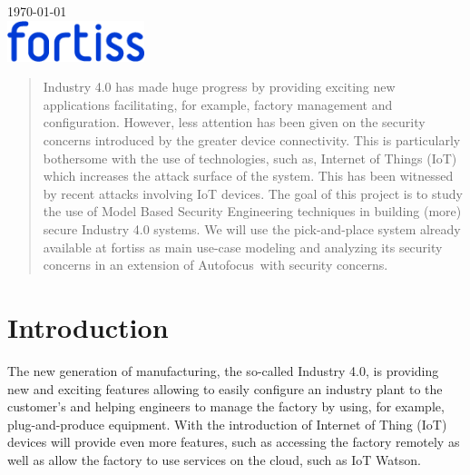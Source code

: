 \begin{titlepage}

{\large \today}\\[1.5cm] %


\includegraphics[width = 0.3\textwidth]{figures/fortiss.png}\\[0.5cm] %

\vfill %

\end{titlepage}

\newcommand\autofocus{Auto{\sc focus}}

\begin{abstract}
Industry 4.0 has made huge progress by providing exciting new applications facilitating, for example, factory management and configuration. However, less attention has been given on the security concerns introduced by the greater device connectivity. This is particularly bothersome with the use of technologies, such as, Internet of Things (IoT) which increases the attack surface of the system. This has been witnessed by recent attacks involving IoT devices. The goal of this project is to study the use of Model Based Security Engineering techniques in building (more) secure Industry 4.0 systems. We will use the pick-and-place system already available at fortiss as main use-case modeling and analyzing its security concerns in an extension of \autofocus\ with security concerns. 
\end{abstract}

\section{Introduction}
The new generation of manufacturing, the so-called Industry 4.0, is providing new and exciting features allowing to easily configure an industry plant to the customer's and helping engineers to manage the factory by using, for example, plug-and-produce equipment. With the introduction of Internet of Thing (IoT) devices will provide even more features, such as accessing the factory remotely as well as allow the factory to use services on the cloud, such as IoT Watson. 

